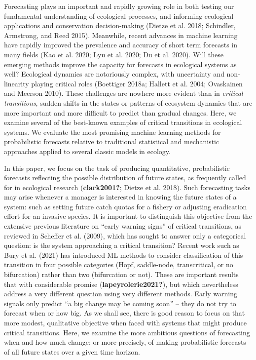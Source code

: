 \documentclass{article}
\begin{document}
Forecasting plays an important and rapidly growing role in both testing
our fundamental understanding of ecological processes, and informing
ecological applications and conservation decision-making (Dietze et al.
2018; Schindler, Armstrong, and Reed 2015). Meanwhile, recent advances
in machine learning have rapidly improved the prevalence and accuracy of
short term forecasts in many fields (Kao et al. 2020; Lyu et al. 2020;
Du et al. 2020). Will these emerging methods improve the capacity for
forecasts in ecological systems as well? Ecological dynamics are
notoriously complex, with uncertainty and non-linearity playing critical
roles (Boettiger 2018a; Hallett et al. 2004; Ovaskainen and Meerson
2010). These challenges are nowhere more evident than in \emph{critical
transitions}, sudden shifts in the states or patterns of ecosystem
dynamics that are more important and more difficult to predict than
gradual changes. Here, we examine several of the best-known examples of
critical transitions in ecological systems. We evaluate the most
promising machine learning methods for probabilistic forecasts relative
to traditional statistical and mechanistic approaches applied to several
classic models in ecology.

In this paper, we focus on the task of producing quantitative,
probabilistic forecasts reflecting the possible distribution of future
states, as frequently called for in ecological research
(\textbf{clark2001?}; Dietze et al. 2018). Such forecasting tasks may
arise whenever a manager is interested in knowing the future states of a
system: such as setting future catch quotas for a fishery or adjusting
eradication effort for an invasive species. It is important to
distinguish this objective from the extensive previous literature on
``early warning signs'' of critical transitions, as reviewed in Scheffer
et al. (2009), which has sought to answer only a categorical question:
is the system approaching a critical transition? Recent work such as
Bury et al. (2021) has introduced ML methods to consider classification
of this transition in four possible categories (Hopf, saddle-node,
transcritical, or no bifurcation) rather than two (bifurcation or not).
These are important results that with considerable promise
(\textbf{lapeyrolerie2021?}), but which nevertheless address a very
different question using very different methods. Early warning signals
only predict ``a big change may be coming soon'' -- they do not try to
forecast when or how big. As we shall see, there is good reason to focus
on that more modest, qualitative objective when faced with systems that
might produce critical transitions. Here, we examine the more ambitious
questions of forecasting when and how much change: or more precisely, of
making probabilistic forecasts of all future states over a given time
horizon.
\end{document}
